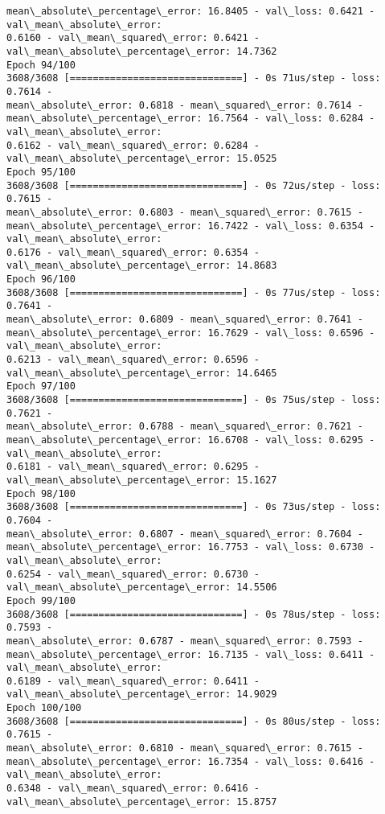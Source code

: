 \documentclass[11pt]{article}
\begin{document}
\begin{Verbatim}[commandchars=\\\{\},fontsize=\footnotesize]
mean\_absolute\_percentage\_error: 16.8405 - val\_loss: 0.6421 - val\_mean\_absolute\_error:
0.6160 - val\_mean\_squared\_error: 0.6421 - val\_mean\_absolute\_percentage\_error: 14.7362
Epoch 94/100
3608/3608 [==============================] - 0s 71us/step - loss: 0.7614 -
mean\_absolute\_error: 0.6818 - mean\_squared\_error: 0.7614 -
mean\_absolute\_percentage\_error: 16.7564 - val\_loss: 0.6284 - val\_mean\_absolute\_error:
0.6162 - val\_mean\_squared\_error: 0.6284 - val\_mean\_absolute\_percentage\_error: 15.0525
Epoch 95/100
3608/3608 [==============================] - 0s 72us/step - loss: 0.7615 -
mean\_absolute\_error: 0.6803 - mean\_squared\_error: 0.7615 -
mean\_absolute\_percentage\_error: 16.7422 - val\_loss: 0.6354 - val\_mean\_absolute\_error:
0.6176 - val\_mean\_squared\_error: 0.6354 - val\_mean\_absolute\_percentage\_error: 14.8683
Epoch 96/100
3608/3608 [==============================] - 0s 77us/step - loss: 0.7641 -
mean\_absolute\_error: 0.6809 - mean\_squared\_error: 0.7641 -
mean\_absolute\_percentage\_error: 16.7629 - val\_loss: 0.6596 - val\_mean\_absolute\_error:
0.6213 - val\_mean\_squared\_error: 0.6596 - val\_mean\_absolute\_percentage\_error: 14.6465
Epoch 97/100
3608/3608 [==============================] - 0s 75us/step - loss: 0.7621 -
mean\_absolute\_error: 0.6788 - mean\_squared\_error: 0.7621 -
mean\_absolute\_percentage\_error: 16.6708 - val\_loss: 0.6295 - val\_mean\_absolute\_error:
0.6181 - val\_mean\_squared\_error: 0.6295 - val\_mean\_absolute\_percentage\_error: 15.1627
Epoch 98/100
3608/3608 [==============================] - 0s 73us/step - loss: 0.7604 -
mean\_absolute\_error: 0.6807 - mean\_squared\_error: 0.7604 -
mean\_absolute\_percentage\_error: 16.7753 - val\_loss: 0.6730 - val\_mean\_absolute\_error:
0.6254 - val\_mean\_squared\_error: 0.6730 - val\_mean\_absolute\_percentage\_error: 14.5506
Epoch 99/100
3608/3608 [==============================] - 0s 78us/step - loss: 0.7593 -
mean\_absolute\_error: 0.6787 - mean\_squared\_error: 0.7593 -
mean\_absolute\_percentage\_error: 16.7135 - val\_loss: 0.6411 - val\_mean\_absolute\_error:
0.6189 - val\_mean\_squared\_error: 0.6411 - val\_mean\_absolute\_percentage\_error: 14.9029
Epoch 100/100
3608/3608 [==============================] - 0s 80us/step - loss: 0.7615 -
mean\_absolute\_error: 0.6810 - mean\_squared\_error: 0.7615 -
mean\_absolute\_percentage\_error: 16.7354 - val\_loss: 0.6416 - val\_mean\_absolute\_error:
0.6348 - val\_mean\_squared\_error: 0.6416 - val\_mean\_absolute\_percentage\_error: 15.8757

    \end{Verbatim}
\end{document}

